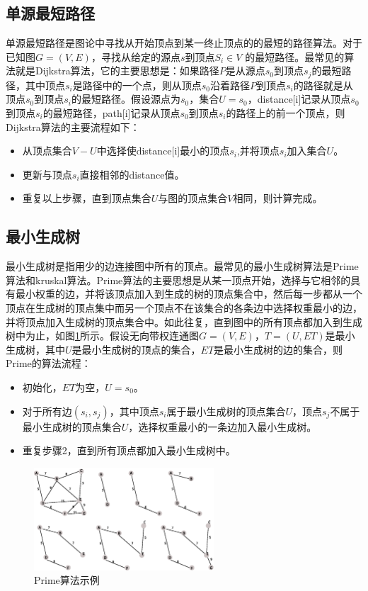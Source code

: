 \subsection{单源最短路径}
单源最短路径是图论中寻找从开始顶点到某一终止顶点的的最短的路径算法。对于已知图$G=(V,E)$，寻找从给定的源点$s$到顶点$S_i ∈ V$ 的最短路径。最常见的算法就是Dijkstra算法，它的主要思想是：如果路径$P$是从源点$s_0$到顶点$s_j$的最短路径，其中顶点$s_i$是路径中的一个点，则从顶点$s_0$沿着路径$P$到顶点$s_i$的路径就是从顶点$s_0$到顶点$s_i$的最短路径。假设源点为$s_0$，集合$U={s_0}$，distance[i]记录从顶点$s_0$到顶点$s_i$的最短路径，path[i]记录从顶点$s_0$到顶点$s_i$的路径上的前一个顶点，则Dijkstra算法的主要流程如下：

\begin{itemize}
\item 从顶点集合$V-U$中选择使distance[i]最小的顶点$s_i$,并将顶点$s_i$加入集合$U$。
\item 更新与顶点$s_i$直接相邻的distance值。
\item 重复以上步骤，直到顶点集合$U$与图的顶点集合$V$相同，则计算完成。
\end{itemize}


\subsection{最小生成树}
最小生成树是指用少的边连接图中所有的顶点。最常见的最小生成树算法是Prime算法和kruskal算法。Prime算法的主要思想是从某一顶点开始，选择与它相邻的具有最小权重的边，并将该顶点加入到生成的树的顶点集合中，然后每一步都从一个顶点在生成树的顶点集中而另一个顶点不在该集合的各条边中选择权重最小的边，并将顶点加入生成树的顶点集合中。如此往复，直到图中的所有顶点都加入到生成树中为止，如图\ref{fig:prime}所示。假设无向带权连通图$G=(V,E)$，$T=(U,ET)$是最小生成树，其中$U$是最小生成树的顶点的集合，$ET$是最小生成树的边的集合，则Prime的算法流程：

\begin{itemize}
\item 初始化，$ET$为空，$U={s_0}$。
\item 对于所有边$(s_i,s_j)$，其中顶点$s_i$属于最小生成树的顶点集合$U$，顶点$s_j$不属于最小生成树的顶点集合$U$，选择权重最小的一条边加入最小生成树。
\item 重复步骤2，直到所有顶点都加入最小生成树中。
\end{itemize}


\begin{figure}[htbp]
\centering
\includegraphics[width=0.6\textwidth]{myfigures/prime}
\caption{Prime算法示例}\label{fig:prime}
\vspace{\baselineskip}
\end{figure}

